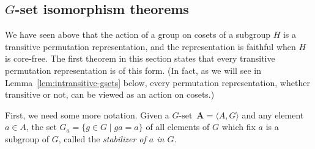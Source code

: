 \documentclass[cm,dissertation]{uhthesis}
\theoremstyle{plain}
\theoremstyle{definition}
\theoremstyle{remark}
\numberwithin{theorem}{section}
\numberwithin{claim}{chapter}
\numberwithin{equation}{section}
\numberwithin{conjecture}{chapter}
\newcommand{\<}{\ensuremath{\langle}}
\renewcommand{\>}{\ensuremath{\rangle}}
\newcommand{\0}{\ensuremath{\mathbf{0}}}
\newcommand{\1}{\ensuremath{\mathbf{1}}}
\newcommand{\2}{\ensuremath{\mathbf{2}}}
\newcommand{\3}{\ensuremath{\mathbf{3}}}
\newcommand{\4}{\ensuremath{\mathbf{4}}}
\newcommand{\5}{\ensuremath{\mathbf{5}}}
\newcommand{\bA}{\ensuremath{\mathbf{A}}}
\newcommand{\Gset}{\ensuremath{G\text{-set}}}
\begin{document}
\subsection{$G$-set isomorphism theorems}
\label{subsec:g-set-isomorphism}
We have seen above that the action of a group on cosets of a subgroup $H$ is a
transitive permutation representation, and the representation is faithful when
$H$ is core-free. 
The first theorem in this section states that every
transitive permutation representation is of this form.
(In fact, as we will see in Lemma~\ref{lem:intransitive-gsets} below, every permutation
representation, whether transitive or not, can be viewed as an action on cosets.)

First, we need some more notation. Given a \Gset\ $\bA = \<A, G\>$ and any
element $a\in A$,  the set  
$G_a = \{g\in G \mid ga = a\}$ 
of all elements of $G$ which fix $a$ is a
subgroup of $G$, called the \emph{stabilizer of $a$ in $G$}.
\end{document}
